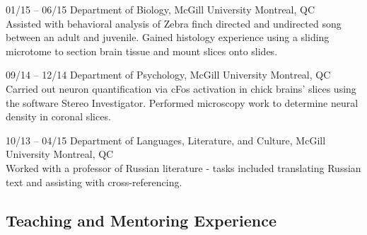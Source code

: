 \documentclass[]{friggeri-cv} %
\begin{document}
\begin{entrylist}


\entry
{01/15 -- 06/15}
{Department of Biology, McGill University}
{Montreal, QC}
{\\
Assisted with behavioral analysis of Zebra finch directed and undirected song
between an adult and juvenile. Gained histology experience using a sliding microtome
to section brain tissue and mount slices onto slides.}

\entry
{09/14 -- 12/14}
{Department of Psychology, McGill University}
{Montreal, QC}
{\\
Carried out neuron quantification via cFos activation
in chick brains' slices using the software Stereo Investigator.
Performed microscopy work to determine neural density in 
coronal slices.
}


\entry
{10/13 -- 04/15}
{Department of Languages, Literature, and Culture, McGill University}
{Montreal, QC}
{\\
Worked with a professor of Russian literature - tasks included translating Russian text and 
assisting with cross-referencing. 
}
\end{entrylist}

\subsection{Teaching and Mentoring Experience}
\end{document}
